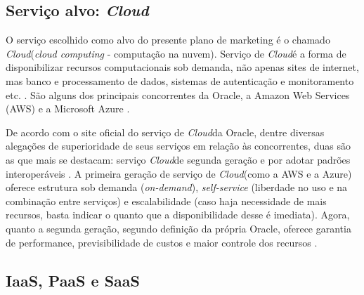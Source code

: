 \documentclass[a4paper]{article}
\newcommand{\C}{\emph{Cloud}}
\begin{document}
\subsection{Serviço alvo: \C}

O serviço escolhido como alvo do presente plano de marketing é o chamado \C  (\emph{cloud computing} - computação na nuvem). Serviço de \C é a forma de disponibilizar recursos computacionais sob demanda, não apenas sites de internet, mas banco e processamento de dados, sistemas de autenticação e monitoramento etc. \cite{Computa60:online}. São alguns dos principais concorrentes da Oracle, a Amazon Web Services (AWS) \cite{AmazonWe34:online} e a Microsoft Azure \cite{Microsoft12:online}. 

De acordo com o site oficial do serviço de \C da Oracle, dentre diversas alegações de superioridade de seus serviços em relação às concorrentes, duas são as que mais se destacam: serviço \C de segunda geração e por adotar padrões interoperáveis \cite{CloudInf85:online}. A primeira geração de serviço de \C (como a AWS e a Azure) oferece estrutura sob demanda (\emph{on-demand}), \emph{self-service} (liberdade no uso e na combinação entre serviços) e escalabilidade (caso haja necessidade de mais recursos, basta indicar o quanto que a disponibilidade desse é imediata). Agora, quanto a segunda geração, segundo definição da própria Oracle, oferece garantia de performance, previsibilidade de custos e maior controle dos recursos \cite{1WhytheW34:online}. 

\subsection{IaaS, PaaS e SaaS}
\end{document}
